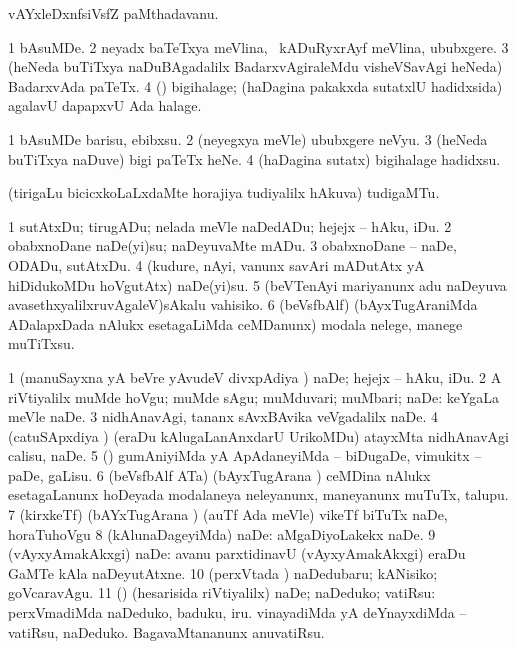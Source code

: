 \bentry
{} 
\gl{\nA}
\expl{}
\bmng
vAYxleDxnfsiVsfZ paMthadavanu. 
\emng
\eentry

\bentry
{} 
\gl{\nA}
\expl{}
\bmng
\bnum
\num{1} bAsuMDe. 
\num{2} neyadx baTeTxya meVlina, \udA\ kADuRyxrAyf meVlina, ububxgere. 
\num{3} (heNeda buTiTxya naDuBAgadalilx BadarxvAgiraleMdu visheVSavAgi heNeda) BadarxvAda paTeTx. 
\num{4} (\nw) bigihalage; (haDagina pakakxda sutatxlU hadidxsida) agalavU dapapxvU Ada halage. 
\enum
\emng
\eentry

\bentry
{} 
\gl{\sakirx}
\expl{}
\bmng
\bnum
\num{1} bAsuMDe barisu, ebibxsu. 
\num{2} (neyegxya meVle) ububxgere neVyu. 
\num{3} (heNeda buTiTxya naDuve) bigi paTeTx heNe. 
\num{4} (haDagina sutatx) bigihalage hadidxsu. 
\enum
\emng
\eentry

\bentry
{} 
\gl{\nA}
\expl{}
\bmng
(tirigaLu bicicxkoLaLxdaMte horajiya tudiyalilx hAkuva) tudigaMTu. 
\emng
\eentry

\bentry
{} 
\gl{\sakirx}
\expl{}
\bmng
\bnum
\num{1} sutAtxDu; tirugADu; nelada meVle naDedADu; hejejx -- hAku, iDu. 
\num{2} obabxnoDane naDe(yi)su; naDeyuvaMte mADu. 
\num{3} obabxnoDane -- naDe, ODADu, sutAtxDu. 
\num{4} (kudure, nAyi, \mo vanunx savAri mADutAtx yA hiDidukoMDu hoVgutAtx) naDe(yi)su. 
\num{5} (beVTenAyi mariyanunx adu naDeyuva avasethxyalilxruvAgaleV)sAkalu vahisiko. 
\num{6} (beVsfbAlf) (bAyxTugAraniMda ADalapxDada nAlukx esetagaLiMda ceMDanunx) modala nelege, manege muTiTxsu. 
\enum
\emng

\noindent
\gl{\akirx}
\expl{}
\bmng
\bnum
\num{1} (manuSayxna yA beVre yAvudeV divxpAdiya \vi) naDe; hejejx -- hAku, iDu. 
\num{2} A riVtiyalilx muMde hoVgu; muMde sAgu; muMduvari; muMbari; naDe:  keYgaLa meVle naDe. 
\num{3} nidhAnavAgi, tananx sAvxBAvika veVgadalilx naDe. 
\num{4} (catuSApxdiya \vi) (eraDu kAlugaLanAnxdarU UrikoMDu) atayxMta nidhAnavAgi calisu, naDe. 
\num{5} (\ame) gumAniyiMda yA ApAdaneyiMda -- biDugaDe, vimukitx -- paDe, gaLisu. 
\num{6} (beVsfbAlf ATa) (bAyxTugArana \vi) ceMDina nAlukx esetagaLanunx hoDeyada modalaneya neleyanunx, maneyanunx muTuTx, talupu. 
\num{7} (kirxkeTf) (bAYxTugArana \vi) (auTf Ada meVle) vikeTf biTuTx naDe, horaTuhoVgu 
\num{8} (kAlunaDageyiMda) naDe:  aMgaDiyoLakekx naDe. 
\num{9} (vAyxyAmakAkxgi) naDe:  avanu parxtidinavU (vAyxyAmakAkxgi) eraDu GaMTe kAla naDeyutAtxne. 
\num{10} (perxVtada \vi) naDedubaru; kANisiko; goVcaravAgu. 
\num{11} (\pArxparx) (hesarisida riVtiyalilx) naDe; naDeduko; vatiRsu:  perxVmadiMda naDeduko, baduku, iru.  vinayadiMda yA deYnayxdiMda -- vatiRsu, naDeduko.  BagavaMtananunx anuvatiRsu. 
\enum
\emng

